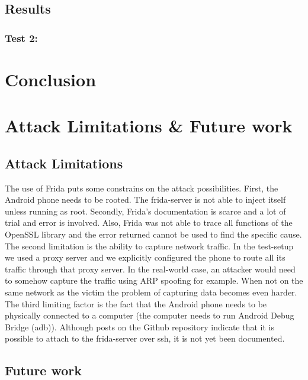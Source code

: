 \documentclass[12pt, a4paper]{report}
\begin{document}
\clearpage

\section{Results}

\subsection{Test 2: }

\chapter{Conclusion}

\chapter{Attack Limitations \& Future work}


\section{Attack Limitations}
The use of Frida puts some constrains on the attack possibilities. First, the Android phone needs to be rooted. The frida-server is not able to inject itself unless running as root. Secondly, Frida's documentation is scarce and a lot of trial and error is involved. Also, Frida was not able to trace all functions of the OpenSSL library and the error returned cannot be used to find the specific cause.  
\newline
\newline
The second limitation is the ability to capture network traffic. In the test-setup we used a proxy server and we explicitly configured the phone to route all its traffic through that proxy server. In the real-world case, an attacker would need to somehow capture the traffic using ARP spoofing for example. When not on the same network as the victim the problem of capturing data becomes even harder. 
\newline
\newline
The third limiting factor is the fact that the Android phone needs to be physically connected to a computer (the computer needs to run Android Debug Bridge (adb)). Although posts on the Github repository indicate that it is possible to attach to the frida-server over ssh, it is not yet been documented.   


\section{Future work}
\end{document}
